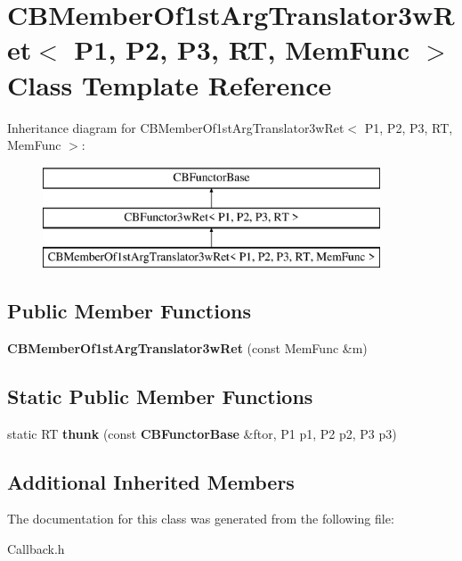 \section{C\+B\+Member\+Of1st\+Arg\+Translator3w\+Ret$<$ P1, P2, P3, RT, Mem\+Func $>$ Class Template Reference}
\label{classCBMemberOf1stArgTranslator3wRet}
Inheritance diagram for C\+B\+Member\+Of1st\+Arg\+Translator3w\+Ret$<$ P1, P2, P3, RT, Mem\+Func $>$\+:\begin{figure}[H]
\begin{center}
\leavevmode
\includegraphics[height=3.000000cm]{classCBMemberOf1stArgTranslator3wRet}
\end{center}
\end{figure}
\subsection*{Public Member Functions}
\begin{DoxyCompactItemize}
\item 
{\bfseries C\+B\+Member\+Of1st\+Arg\+Translator3w\+Ret} (const Mem\+Func \&m)\label{classCBMemberOf1stArgTranslator3wRet_a1cc9c0e22254d70012d775811e803851}

\end{DoxyCompactItemize}
\subsection*{Static Public Member Functions}
\begin{DoxyCompactItemize}
\item 
static RT {\bfseries thunk} (const {\bf C\+B\+Functor\+Base} \&ftor, P1 p1, P2 p2, P3 p3)\label{classCBMemberOf1stArgTranslator3wRet_a76d2c43bcccf4bba447159433ad02a40}

\end{DoxyCompactItemize}
\subsection*{Additional Inherited Members}


The documentation for this class was generated from the following file\+:\begin{DoxyCompactItemize}
\item 
Callback.\+h\end{DoxyCompactItemize}
